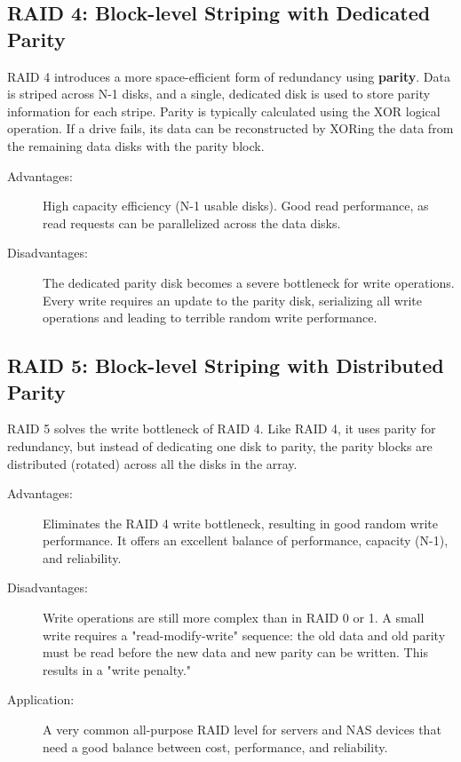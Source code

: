 \subsection{RAID 4: Block-level Striping with Dedicated Parity}
RAID 4 introduces a more space-efficient form of redundancy using \textbf{parity}. Data is striped across N-1 disks, and a single, dedicated disk is used to store parity information for each stripe. Parity is typically calculated using the XOR logical operation. If a drive fails, its data can be reconstructed by XORing the data from the remaining data disks with the parity block.
\begin{description}
    \item[Advantages:] High capacity efficiency (N-1 usable disks). Good read performance, as read requests can be parallelized across the data disks.
    \item[Disadvantages:] The dedicated parity disk becomes a severe bottleneck for write operations. Every write requires an update to the parity disk, serializing all write operations and leading to terrible random write performance.
\end{description}

\subsection{RAID 5: Block-level Striping with Distributed Parity}
RAID 5 solves the write bottleneck of RAID 4. Like RAID 4, it uses parity for redundancy, but instead of dedicating one disk to parity, the parity blocks are distributed (rotated) across all the disks in the array.
\begin{description}
    \item[Advantages:] Eliminates the RAID 4 write bottleneck, resulting in good random write performance. It offers an excellent balance of performance, capacity (N-1), and reliability.
    \item[Disadvantages:] Write operations are still more complex than in RAID 0 or 1. A small write requires a "read-modify-write" sequence: the old data and old parity must be read before the new data and new parity can be written. This results in a "write penalty."
    \item[Application:] A very common all-purpose RAID level for servers and NAS devices that need a good balance between cost, performance, and reliability.
\end{description}

